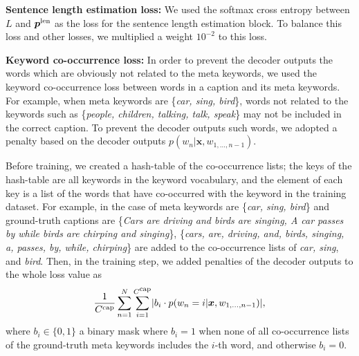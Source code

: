 \documentclass{article}
\begin{document}
\begin{sloppy}
\vspace{3pt}
\noindent
{\bf Sentence length estimation loss:}
We used the softmax cross entropy between $L$ and $\bm{p}^{\mbox{\scriptsize len}}$ as the loss for the sentence length estimation block.
To balance this loss and other losses, we multiplied a weight $10^{-2}$ to this loss.



\vspace{3pt}
\noindent
{\bf Keyword co-occurrence loss:}
In order to prevent the decoder outputs the words which are obviously not related to the meta keywords, we used the keyword co-occurrence loss between words in a caption and its meta keywords.
For example, when meta keywords are \{{\it car, sing, bird}\}, words not related to the keywords such as \{{\it people, children, talking, talk, speak}\} may not be included in the correct caption.
To prevent the decoder outputs such words, we adopted a penalty based on the decoder outputs $p( w_n | \bm{x}, w_{1,..., n-1} )$.

Before training, we created a hash-table of the co-occurrence lists; the keys of the hash-table are all keywords in the keyword vocabulary, and the element of each key is a list of the words that have co-occurred with the keyword in the training dataset.
For example, in the case of meta keywords are \{{\it car, sing, bird}\} and ground-truth captions are \{{\it Cars are driving and birds are singing, A car passes by while birds are chirping and singing}\}, 
\{{\it cars, are, driving, and, birds, singing, a, passes, by, while, chirping}\} are added to the co-occurrence lists of {\it car, sing}, and {\it bird}.
Then, in the training step, we added penalties of the decoder outputs to the whole loss value as
\begin{equation}
\frac{1}{C^{\mbox{\scriptsize cap}}}
\sum _{n=1}^N
\sum_{i=1}^{C^{\mbox{\scriptsize cap}}}
\lvert
b_i
\cdot
p( w_n = i | \bm{x}, w_{1,..., n-1} )
\rvert,
\end{equation}
where $b_i \in \{0, 1\} $ a binary mask where $b_i=1$ when none of all co-occurrence lists of the ground-truth meta keywords includes the $i$-th word, and otherwise $b_i=0$.




\end{sloppy}
\end{document}
